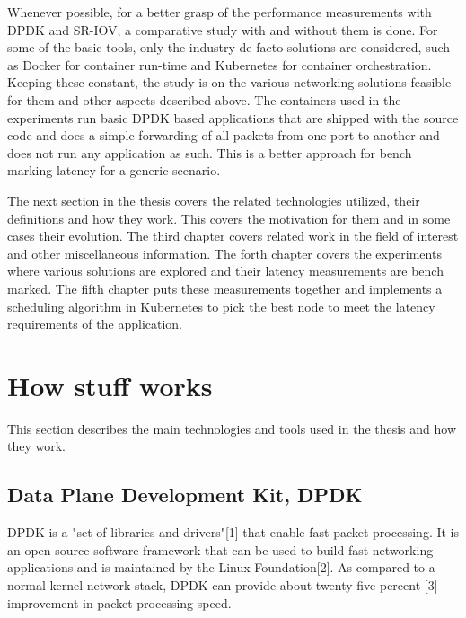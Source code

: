 \documentclass[english, 12pt, a4paper, elec, utf8, a-1b, online]{aaltothesis}
\begin{document}
Whenever possible, for a better grasp of the performance measurements with DPDK and SR-IOV, a comparative study with and without them is done. For some of the basic tools, only the industry de-facto solutions are considered, such as  Docker for container run-time and Kubernetes for container orchestration. Keeping these constant, the study is on the various networking solutions feasible for them and other aspects described above. The containers used in the experiments run basic DPDK based applications that are shipped with the source code and does a simple forwarding of all packets from one port to another and does not run any application as such. This is a better approach for bench marking latency for a generic scenario.

The next section in the thesis covers the related technologies utilized, their definitions and how they work. This covers the motivation for them and in some cases their evolution. The third chapter covers related work in the field of interest and other miscellaneous information. The forth chapter covers the experiments where various solutions are explored and their latency measurements are bench marked. The fifth chapter puts these measurements together and implements a scheduling algorithm in Kubernetes to pick the best node to meet the latency requirements of the application.

\clearpage
\section{How stuff works}
This section describes the main technologies and tools used in the thesis and how they work.

\subsection{Data Plane Development Kit, DPDK}
DPDK is a "set of libraries and drivers"[1] that enable fast packet processing. It is an open source software framework that can be used to build fast networking applications and is maintained by the Linux Foundation[2]. As compared to a normal kernel network stack, DPDK can provide about twenty five percent [3] improvement in packet processing speed.
\end{document}
